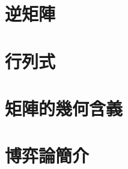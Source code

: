 \documentclass[12pt]{article}
\begin{document}
    \section*{逆矩陣}

    \section*{行列式}

    \section*{矩陣的幾何含義}

    \section*{博弈論簡介}
\end{document}
